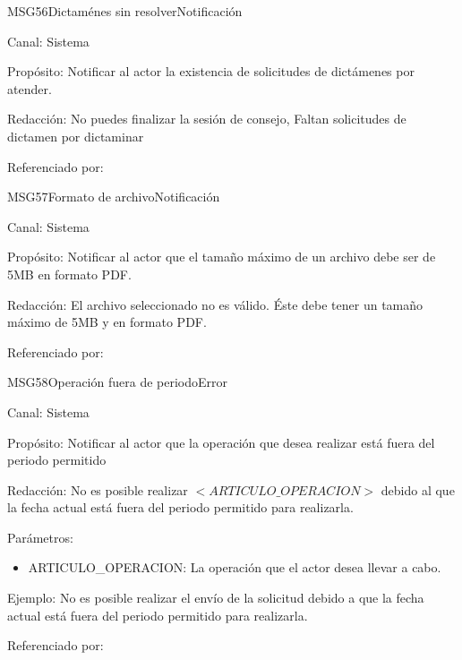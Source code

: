 \begin{mensaje}{MSG56}{Dictaménes sin resolver}{Notificación}
	\item[Canal:] Sistema
	\item[Propósito:] Notificar al actor la existencia de solicitudes de dictámenes por atender.
	\item[Redacción:] No puedes finalizar la sesión de consejo, Faltan solicitudes de dictamen por dictaminar
	\item[Referenciado por: ] 
\end{mensaje}

\begin{mensaje}{MSG57}{Formato de archivo}{Notificación}
	\item[Canal:] Sistema
	\item[Propósito:] Notificar al actor que el tamaño máximo de un archivo debe ser de 5MB en formato PDF.
	\item[Redacción:] El archivo seleccionado no es válido. Éste debe tener un tamaño máximo de 5MB y en formato PDF.
	\item[Referenciado por: ] 
\end{mensaje}

\begin{mensaje}{MSG58}{Operación fuera de periodo}{Error}
	\item[Canal:] Sistema
	\item[Propósito:] Notificar al actor que la operación que desea realizar está fuera del periodo permitido
	\item[Redacción:] No es posible realizar $<ARTICULO\_OPERACION>$ debido al que la fecha actual está fuera del periodo permitido para realizarla.
	\item[Parámetros:] 
	\begin{itemize}
		\item ARTICULO\_OPERACION: La operación que el actor desea llevar a cabo.
	\end{itemize}
	\item[Ejemplo:] No es posible realizar el envío de la solicitud debido a que la fecha actual está fuera del periodo permitido para realizarla.
	\item[Referenciado por: ] 
\end{mensaje}


